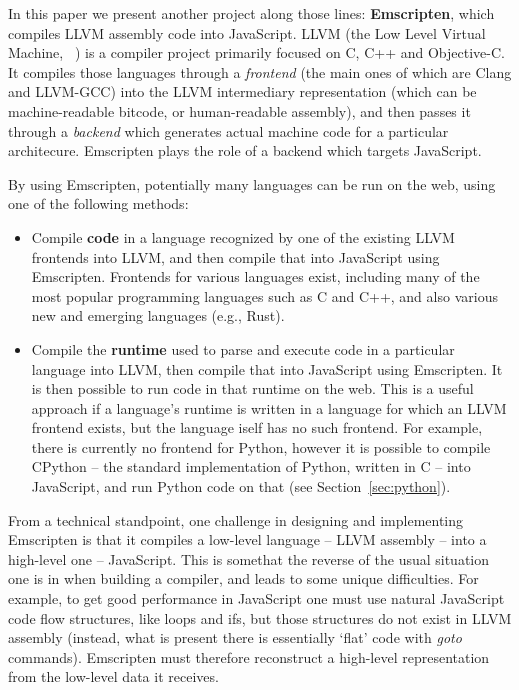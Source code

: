 \documentclass[11pt]{proc}
\begin{document}
In this paper we present another project along those lines: \textbf{Emscripten},
which compiles LLVM assembly code into JavaScript. LLVM (the Low Level Virtual
Machine, ~\cite{llvm}) is a compiler project primarily focused on C, C++ and
Objective-C. It compiles those languages through a \emph{frontend} (the
main ones of which are Clang and LLVM-GCC) into the
LLVM intermediary representation (which can be machine-readable
bitcode, or human-readable assembly), and then passes it
through a \emph{backend} which generates actual machine code for a particular
architecure. Emscripten plays the role of a backend which targets JavaScript.

By using Emscripten, potentially many languages can be
run on the web, using one of the following methods:
\begin{itemize}
\item Compile \textbf{code} in a language recognized by one of the existing LLVM frontends
      into LLVM, and then compile that
      into JavaScript using Emscripten. Frontends for various languages
      exist, including many of the most popular programming languages such as C and
      C++, and also various new and emerging languages (e.g., Rust).
\item Compile the \textbf{runtime} used to parse and execute code in
      a particular language into LLVM, then compile that into JavaScript using
      Emscripten. It is then possible to run code in that runtime on the web.
      This is a useful approach if
      a language's runtime is written in a language for which an LLVM
      frontend exists, but the language iself has no such frontend. For
      example, there is currently no frontend for Python, however
      it is possible to compile CPython -- the standard implementation of
      Python, written in C -- into JavaScript, and run Python code on that
      (see Section~\ref{sec:python}).
\end{itemize}

From a technical standpoint, one challenge in designing and implementing
Emscripten is that it compiles a low-level language -- LLVM assembly -- into
a high-level one -- JavaScript. This is somethat the reverse of the usual
situation one is in when building a compiler, and leads to some unique
difficulties. For example, to get good performance in JavaScript one must
use natural JavaScript code flow structures, like loops and ifs, but
those structures do not exist in LLVM assembly (instead, what is present
there is essentially `flat' code with \emph{goto} commands).
Emscripten must therefore reconstruct a high-level
representation from the low-level data it receives.
\end{document}
